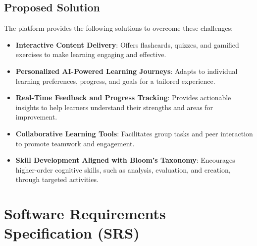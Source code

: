\documentclass[12pt]{article}
\begin{document}
\subsection{Proposed Solution}
The platform provides the following solutions to overcome these challenges:
\begin{itemize}
    \item \textbf{Interactive Content Delivery}: Offers flashcards, quizzes, and gamified exercises to make learning engaging and effective.
    \item \textbf{Personalized AI-Powered Learning Journeys}: Adapts to individual learning preferences, progress, and goals for a tailored experience.
    \item \textbf{Real-Time Feedback and Progress Tracking}: Provides actionable insights to help learners understand their strengths and areas for improvement.
    \item \textbf{Collaborative Learning Tools}: Facilitates group tasks and peer interaction to promote teamwork and engagement.
    \item \textbf{Skill Development Aligned with Bloom's Taxonomy}: Encourages higher-order cognitive skills, such as analysis, evaluation, and creation, through targeted activities.
\end{itemize}


\section{Software Requirements Specification (SRS)}
\end{document}

